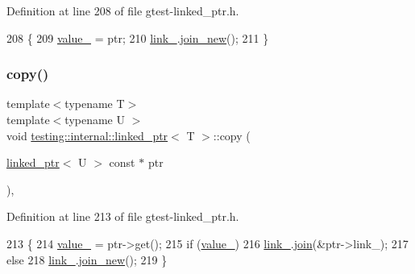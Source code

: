 Definition at line 208 of file gtest-\/linked\+\_\+ptr.\+h.


\begin{DoxyCode}
208                        \{
209     \hyperlink{classtesting_1_1internal_1_1linked__ptr_abb52c4e944fc7a24a4ec7788b612fb37}{value\_} = ptr;
210     \hyperlink{classtesting_1_1internal_1_1linked__ptr_a8fdfa75fea8bfc10825a3cc53c50461f}{link\_}.\hyperlink{classtesting_1_1internal_1_1linked__ptr__internal_a742af1f65df2d5e2b7198a1b74264a83}{join\_new}();
211   \}
\end{DoxyCode}
\mbox{\label{classtesting_1_1internal_1_1linked__ptr_aea2859970b65708fc4f7c8c4cbc7928a}} 
\subsubsection{\texorpdfstring{copy()}{copy()}}
{\footnotesize\ttfamily template$<$typename T$>$ \\
template$<$typename U $>$ \\
void \hyperlink{classtesting_1_1internal_1_1linked__ptr}{testing\+::internal\+::linked\+\_\+ptr}$<$ T $>$\+::copy (\begin{DoxyParamCaption}\item[{\hyperlink{classtesting_1_1internal_1_1linked__ptr}{linked\+\_\+ptr}$<$ U $>$ const $\ast$}]{ptr }\end{DoxyParamCaption})\hspace{0.3cm}{\ttfamily [inline]}, {\ttfamily [private]}}



Definition at line 213 of file gtest-\/linked\+\_\+ptr.\+h.


\begin{DoxyCode}
213                                                             \{
214     \hyperlink{classtesting_1_1internal_1_1linked__ptr_abb52c4e944fc7a24a4ec7788b612fb37}{value\_} = ptr->get();
215     \textcolor{keywordflow}{if} (\hyperlink{classtesting_1_1internal_1_1linked__ptr_abb52c4e944fc7a24a4ec7788b612fb37}{value\_})
216       \hyperlink{classtesting_1_1internal_1_1linked__ptr_a8fdfa75fea8bfc10825a3cc53c50461f}{link\_}.\hyperlink{classtesting_1_1internal_1_1linked__ptr__internal_acd5a341459f7e81b10b4112d8c764e2a}{join}(&ptr->link\_);
217     \textcolor{keywordflow}{else}
218       \hyperlink{classtesting_1_1internal_1_1linked__ptr_a8fdfa75fea8bfc10825a3cc53c50461f}{link\_}.\hyperlink{classtesting_1_1internal_1_1linked__ptr__internal_a742af1f65df2d5e2b7198a1b74264a83}{join\_new}();
219   \}
\end{DoxyCode}
\mbox{\label{classtesting_1_1internal_1_1linked__ptr_a0852ab20839140f29b2ad074339fccc7}} 

